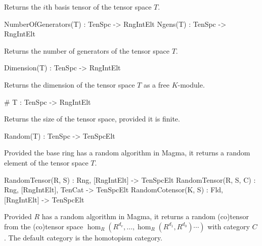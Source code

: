 Returns the $i$th basis tensor of the tensor space $T$.

\begin{intrinsics}
NumberOfGenerators(T) : TenSpc -> RngIntElt
Ngens(T) : TenSpc -> RngIntElt
\end{intrinsics}

Returns the number of generators of the tensor space $T$.

\begin{intrinsics}
Dimension(T) : TenSpc -> RngIntElt
\end{intrinsics}

Returns the dimension of the tensor space $T$ as a free $K$-module.

\index{\#}
\begin{intrinsics}
# T : TenSpc -> RngIntElt
\end{intrinsics}

Returns the size of the tensor space, provided it is finite.

\begin{intrinsics}
Random(T) : TenSpc -> TenSpcElt
\end{intrinsics}

Provided the base ring has a random algorithm in Magma, it returns a random 
element of the tensor space $T$.

\begin{intrinsics}
RandomTensor(R, S) : Rng, [RngIntElt] -> TenSpcElt
RandomTensor(R, S, C) : Rng, [RngIntElt], TenCat -> TenSpcElt
RandomCotensor(K, S) : Fld, [RngIntElt] -> TenSpcElt
\end{intrinsics}

Provided $R$ has a random algorithm in Magma, it returns a random (co)tensor from 
the (co)tensor space $\hom_R(R^{d_v},\dots,\hom_R(R^{d_1},R^{d_0})\cdots )$ with category $C$.
The default category is the homotopism category.

